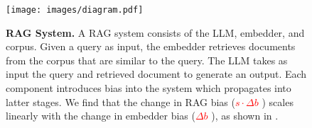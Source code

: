 \begin{figure}[t]
    \centering
    \texttt{[image: images/diagram.pdf]}
    \caption{\textbf{RAG System.} A RAG system consists of the LLM, embedder, and corpus. Given a query as input, the embedder retrieves documents from the corpus that are similar to the query. The LLM takes as input the query and retrieved document to generate an output. Each component introduces bias into the system which propagates into latter stages. We find that the change in RAG bias (\textcolor{red}{$s \cdot \Delta b$}
) scales linearly with the change in embedder bias (\textcolor{red}{$\Delta b$}
), as shown in .}
    \label{fig:diagram}
\end{figure}